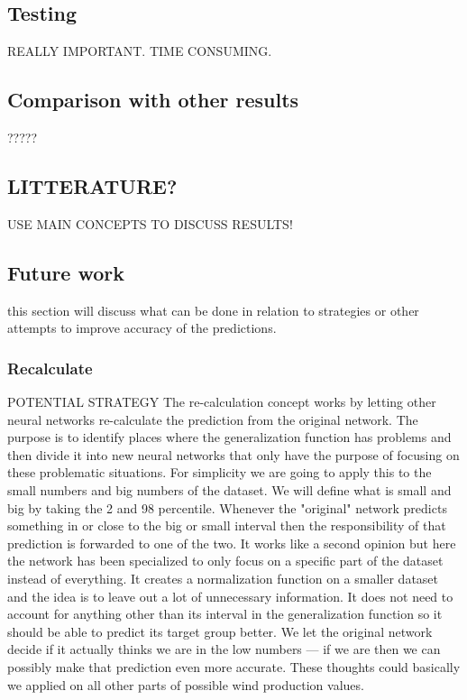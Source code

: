 \subsection{Testing}
REALLY IMPORTANT. TIME CONSUMING.




\subsection{Comparison with other results}
?????

\subsection{LITTERATURE?}
USE MAIN CONCEPTS TO DISCUSS RESULTS!

\subsection{Future work}
this section will discuss what can be done in relation to strategies or other attempts to improve accuracy of the predictions.

\subsubsection{Recalculate}
POTENTIAL STRATEGY
The re-calculation concept works by letting other neural networks re-calculate the prediction from the original network. The purpose is to identify places where the generalization function has problems and then divide it into new neural networks that only have the purpose of focusing on these problematic situations. For simplicity we are going to apply this to the small numbers and big numbers of the dataset. We will define what is small and big by taking the 2 and 98 percentile. Whenever the "original" network predicts something in or close to the big or small interval then the responsibility of that prediction is forwarded to one of the two. It works like a second opinion but here the network has been specialized to only focus on a specific part of the dataset instead of everything. It creates a normalization function on a smaller dataset and the idea is to leave out a lot of unnecessary information. It does not need to account for anything other than its interval in the generalization function so it should be able to predict its target group better. We let the original network decide if it actually thinks we are in the low numbers --- if we are then we can possibly make that prediction even more accurate. These thoughts could basically we applied on all other parts of possible wind production values. 


